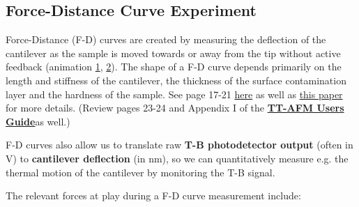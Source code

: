 \documentclass{../lab}
\newcommand{\afmuserguide}{\href{https://berkeley-physics111b.github.io/assets/pdf/oldwebsitestructure/AFMImages/TT_AFM\%20User-Guide-V2.2-600DPI.pdf}{\textbf{TT-AFM Users Guide}}}
\begin{document}
\subsection{Force-Distance Curve Experiment}
\label{subsec:ForceDistance}

Force-Distance (F-D) curves are created by measuring the deflection of the cantilever as the sample is moved towards or away from the tip without active feedback (animation \href{https://berkeley-physics111b.github.io/assets/pdf/oldwebsitestructure/AFMImages/Force-distance\_curves\_en\_video.mp4}{1}, \href{https://berkeley-physics111b.github.io/assets/pdf/oldwebsitestructure/AFMImages/6.1\%20Tip\%20Sample.flv\_converted.mp4}{2}).  The shape of a F-D curve depends primarily on the length and stiffness of the cantilever, the thickness of the surface contamination layer and the hardness of the sample. See page 17-21 \href{https://berkeley-physics111b.github.io/assets/pdf/oldwebsitestructure/AFMImages/Lecture\_10\_AFM.pdf}{here} as well as \href{https://berkeley-physics111b.github.io/assets/pdf/oldwebsitestructure/AFMImages/butt\_AFM.pdf}{this paper} for more details. (Review pages 23-24 and Appendix I of the \afmuserguide as well.)

F-D curves also allow us to translate raw \textbf{T-B photodetector output} (often in V) to \textbf{cantilever deflection} (in nm), so we can quantitatively measure e.g. the thermal motion of the cantilever by monitoring the T-B signal. 


The relevant forces at play during a F-D curve measurement include:
\end{document}
